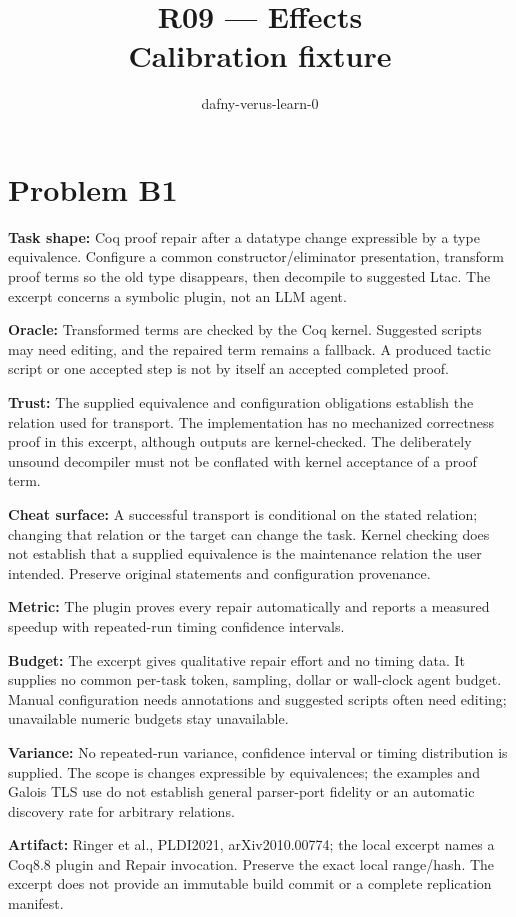 \documentclass[11pt]{article}
\title{R09 --- Effects \\ \large Calibration fixture}
\author{dafny-verus-learn-0}
\date{}
\begin{document}
\maketitle
\section*{Problem B1}\label{ans:B1}
\begin{answer}
\textbf{Task shape:} Coq proof repair after a datatype change expressible by a type equivalence. Configure a common constructor/eliminator presentation, transform proof terms so the old type disappears, then decompile to suggested Ltac. The excerpt concerns a symbolic plugin, not an LLM agent.

\textbf{Oracle:} Transformed terms are checked by the Coq kernel. Suggested scripts may need editing, and the repaired term remains a fallback. A produced tactic script or one accepted step is not by itself an accepted completed proof.

\textbf{Trust:} The supplied equivalence and configuration obligations establish the relation used for transport. The implementation has no mechanized correctness proof in this excerpt, although outputs are kernel-checked. The deliberately unsound decompiler must not be conflated with kernel acceptance of a proof term.

\textbf{Cheat surface:} A successful transport is conditional on the stated relation; changing that relation or the target can change the task. Kernel checking does not establish that a supplied equivalence is the maintenance relation the user intended. Preserve original statements and configuration provenance.

\textbf{Metric:} The plugin proves every repair automatically and reports a measured speedup with repeated-run timing confidence intervals.

\textbf{Budget:} The excerpt gives qualitative repair effort and no timing data. It supplies no common per-task token, sampling, dollar or wall-clock agent budget. Manual configuration needs annotations and suggested scripts often need editing; unavailable numeric budgets stay unavailable.

\textbf{Variance:} No repeated-run variance, confidence interval or timing distribution is supplied. The scope is changes expressible by equivalences; the examples and Galois TLS use do not establish general parser-port fidelity or an automatic discovery rate for arbitrary relations.

\textbf{Artifact:} Ringer et al., PLDI2021, arXiv2010.00774; the local excerpt names a Coq8.8 plugin and Repair invocation. Preserve the exact local range/hash. The excerpt does not provide an immutable build commit or a complete replication manifest.
\end{answer}
\end{document}
